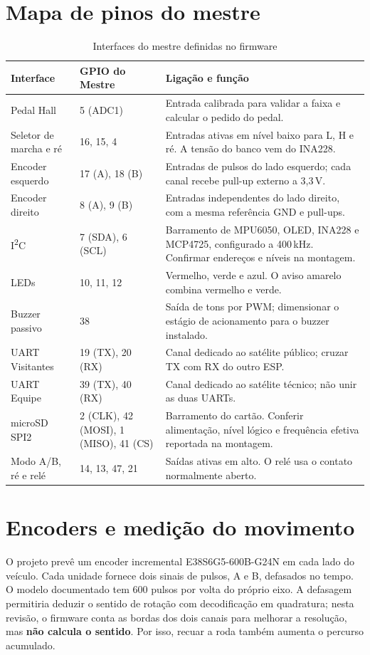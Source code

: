 \section{Mapa de pinos do mestre}
\begin{table}[htbp]\centering\small
\caption{Interfaces do mestre definidas no firmware}\label{tab:pinos-mestre}
\begin{tabularx}{\textwidth}{@{}p{3.0cm}p{2.4cm}X@{}}\toprule
Interface & GPIO do Mestre & Ligação e função\\\midrule
Pedal Hall & 5 (ADC1) & Entrada calibrada para validar a faixa e calcular o pedido do pedal.\\
Seletor de marcha e ré & 16, 15, 4 & Entradas ativas em nível baixo para L, H e ré. A tensão do banco vem do INA228.\\
Encoder esquerdo & 17 (A), 18 (B) & Entradas de pulsos do lado esquerdo; cada canal recebe pull-up externo a 3,3\,V.\\
Encoder direito & 8 (A), 9 (B) & Entradas independentes do lado direito, com a mesma referência GND e pull-ups.\\
I\textsuperscript{2}C & 7 (SDA), 6 (SCL) & Barramento de MPU6050, OLED, INA228 e MCP4725, configurado a 400\,kHz. Confirmar endereços e níveis na montagem.\\
LEDs & 10, 11, 12 & Vermelho, verde e azul. O aviso amarelo combina vermelho e verde.\\
Buzzer passivo & 38 & Saída de tons por PWM; dimensionar o estágio de acionamento para o buzzer instalado.\\
UART Visitantes & 19 (TX), 20 (RX) & Canal dedicado ao satélite público; cruzar TX com RX do outro ESP.\\
UART Equipe & 39 (TX), 40 (RX) & Canal dedicado ao satélite técnico; não unir as duas UARTs.\\
microSD SPI2 & 2 (CLK), 42 (MOSI), 1 (MISO), 41 (CS) & Barramento do cartão. Conferir alimentação, nível lógico e frequência efetiva reportada na montagem.\\
Modo A/B, ré e relé & 14, 13, 47, 21 & Saídas ativas em alto. O relé usa o contato normalmente aberto.\\\bottomrule
\end{tabularx}\end{table}

\section{Encoders e medição do movimento}
O projeto prevê um encoder incremental E38S6G5-600B-G24N em cada lado do veículo. Cada unidade fornece dois sinais de pulsos, A e B, defasados no tempo. O modelo documentado tem 600 pulsos por volta do próprio eixo. A defasagem permitiria deduzir o sentido de rotação com decodificação em quadratura; nesta revisão, o firmware conta as bordas dos dois canais para melhorar a resolução, mas \textbf{não calcula o sentido}. Por isso, recuar a roda também aumenta o percurso acumulado.

